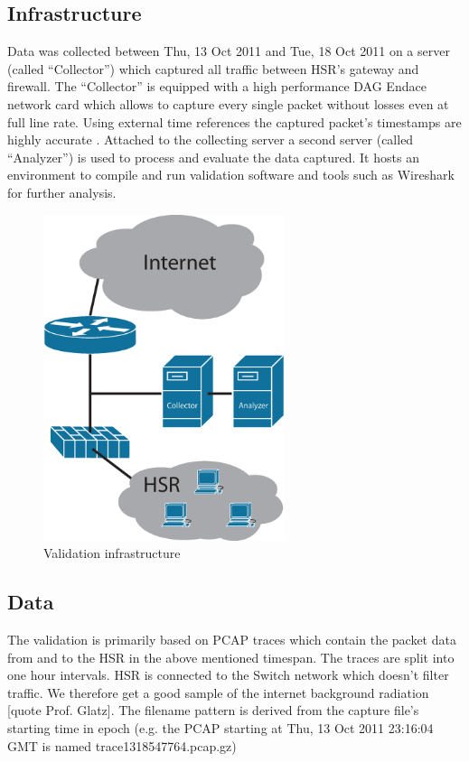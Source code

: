 \documentclass[a4paper]{scrartcl}
\begin{document}
\subsection{Infrastructure}
Data was collected between Thu, 13 Oct 2011 and Tue, 18 Oct 2011 on a server (called ``Collector'') which captured all traffic between HSR's gateway and firewall.  The ``Collector'' is equipped with a high performance DAG Endace network card which allows to capture every single packet without losses even at full line rate. Using external time references the captured packet's timestamps are highly accurate \cite{endace}. Attached to the collecting server a second server (called ``Analyzer'') is used to process and evaluate the data captured. It hosts an environment to compile and run validation software and tools such as Wireshark for further analysis.
\begin{figure}[ht]
	\begin{center}
		\includegraphics[width=200pt, keepaspectratio=true]{Bilder/Infrastruktur.eps}
		\caption{Validation infrastructure}
		\label{infra}
	\end{center}
\end{figure}

\subsection{Data}
The validation is primarily based on PCAP traces which contain the packet data from and to the HSR in the above mentioned timespan. The traces are split into one hour intervals. HSR is connected to the Switch network which doesn't filter traffic. We therefore get a good sample of the internet background radiation [quote Prof. Glatz]. The filename pattern is derived from the capture file's starting time in epoch (e.g. the PCAP starting at Thu, 13 Oct 2011 23:16:04 GMT is named trace1318547764.pcap.gz)
\end{document}
